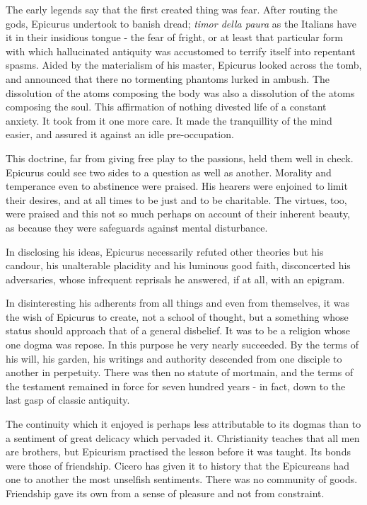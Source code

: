 \documentclass[]{book}
\begin{document}
The early legends say that the first created thing was fear. After
routing the gods, Epicurus undertook to banish dread; \emph{timor della
paura} as the Italians have it in their insidious tongue - the fear of
fright, or at least that particular form with which hallucinated
antiquity was accustomed to terrify itself into repentant spasms. Aided
by the materialism of his master, Epicurus looked across the tomb, and
announced that there no tormenting phantoms lurked in ambush. The
dissolution of the atoms composing the body was also a dissolution of
the atoms composing the soul. This affirmation of nothing divested life
of a constant anxiety. It took from it one more care. It made the
tranquillity of the mind easier, and assured it against an idle
pre-occupation.

This doctrine, far from giving free play to the passions, held them well
in check. Epicurus could see two sides to a question as well as another.
Morality and temperance even to abstinence were praised. His hearers
were enjoined to limit their desires, and at all times to be just and to
be charitable. The virtues, too, were praised and this not so much
perhaps on account of their inherent beauty, as because they were
safeguards against mental disturbance.

In disclosing his ideas, Epicurus necessarily refuted other theories but
his candour, his unalterable placidity and his luminous good faith,
disconcerted his adversaries, whose infrequent reprisals he answered, if
at all, with an epigram.

In disinteresting his adherents from all things and even from
themselves, it was the wish of Epicurus to create, not a school of
thought, but a something whose status should approach that of a general
disbelief. It was to be a religion whose one dogma was repose. In this
purpose he very nearly succeeded. By the terms of his will, his garden,
his writings and authority descended from one disciple to another in
perpetuity. There was then no statute of mortmain, and the terms of the
testament remained in force for seven hundred years - in fact, down to
the last gasp of classic antiquity.

The continuity which it enjoyed is perhaps less attributable to its
dogmas than to a sentiment of great delicacy which pervaded it.
Christianity teaches that all men are brothers, but Epicurism practised
the lesson before it was taught. Its bonds were those of friendship.
Cicero has given it to history that the Epicureans had one to another
the most unselfish sentiments. There was no community of goods.
Friendship gave its own from a sense of pleasure and not from
constraint.
\end{document}
